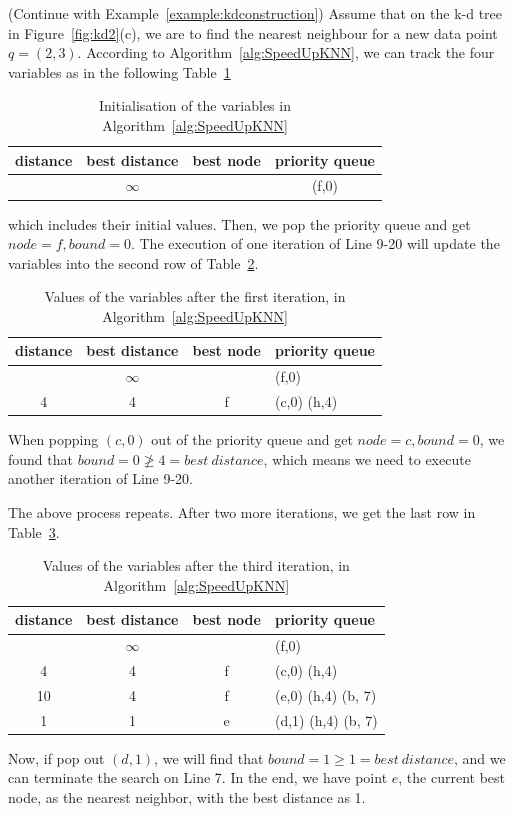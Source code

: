 \begin{example} (Continue with Example~\ref{example:kdconstruction})
Assume that on the k-d tree in  Figure~\ref{fig:kd2}(c), we are to find the nearest neighbour for a new data point $q=(2,3)$. According to Algorithm~\ref{alg:SpeedUpKNN}, we can track the four variables as in the following Table~\ref{tab:kd3} 
\begin{table}[!htbp]
    \centering
    \begin{tabular}{|c|c|c|c|}
    \hline
        distance & best distance & best node & priority queue \\
        \hline
         & $\infty$ && (f,0)\\
         \hline
    \end{tabular}
    \caption{Initialisation of the variables in Algorithm~\ref{alg:SpeedUpKNN}}
    \label{tab:kd3}
\end{table}
which includes their initial values. Then, we pop the priority queue and get $node=f, bound=0$. The execution of one iteration of Line 9-20 will update the variables into the second row of Table~\ref{tab:kd4}. 
\begin{table}[!htbp]
    \centering
    \begin{tabular}{|c|c|c|l|}
    \hline
        distance & best distance & best node & priority queue \\
        \hline
         & $\infty$ && (f,0)\\
         \hline
        4 & 4 & f & (c,0) (h,4)\\
         \hline
    \end{tabular}
    \caption{Values of the variables after the first iteration, in Algorithm~\ref{alg:SpeedUpKNN}}
    \label{tab:kd4}
\end{table}
When popping $(c,0)$ out of the priority queue and get $node=c, bound=0$, we found that $bound  = 0 \not \geq 4 = best~ distance$, which means we need to execute another iteration of Line 9-20. 

The above process repeats. After two more iterations, we get the last row in Table~\ref{tab:kd5}. 
\begin{table}[!htbp]
    \centering
    \begin{tabular}{|c|c|c|l|}
    \hline
        distance & best distance & best node & priority queue \\
        \hline
         & $\infty$ && (f,0)\\
         \hline
        4 & 4 & f & (c,0) (h,4)\\
         \hline
        10 & 4 & f & (e,0) (h,4) (b, 7) \\
         \hline
        1 & 1 & e & (d,1) (h,4) (b, 7) \\
         \hline
    \end{tabular}
    \caption{Values of the variables after the third iteration, in Algorithm~\ref{alg:SpeedUpKNN}}
    \label{tab:kd5}
\end{table}
Now, if  pop out $(d,1)$, we will find that $bound =1 \geq 1 = best~ distance$, and we can terminate the search on Line 7. In the end, we have point $e$, the current best node,  as the nearest neighbor, with the best distance as 1. 
\end{example}

